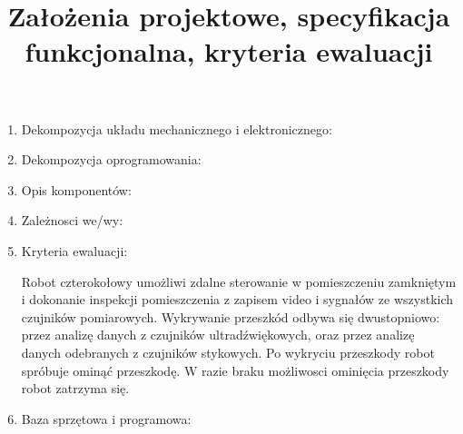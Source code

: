 \documentclass[a4paper]{article}
\title{Założenia projektowe, specyfikacja funkcjonalna, kryteria ewaluacji}
\date{}
\author{}
\begin{document}
\maketitle

\begin{enumerate}

\item Dekompozycja układu mechanicznego i elektronicznego:

\item Dekompozycja oprogramowania:

\item Opis komponentów:

\item Zależnosci we/wy:

\item Kryteria ewaluacji:

Robot czterokołowy umożliwi zdalne sterowanie w pomieszczeniu zamkniętym i dokonanie inspekcji pomieszczenia z zapisem video i sygnałów ze wszystkich czujników pomiarowych. Wykrywanie przeszkód odbywa się dwustopniowo: przez analizę danych z czujników ultradźwiękowych, oraz przez analizę danych odebranych z czujników stykowych. Po wykryciu przeszkody robot spróbuje ominąć przeszkodę. W razie braku możliwosci ominięcia przeszkody robot zatrzyma się.

\item Baza sprzętowa i programowa:

\end{enumerate}
\end{document}
